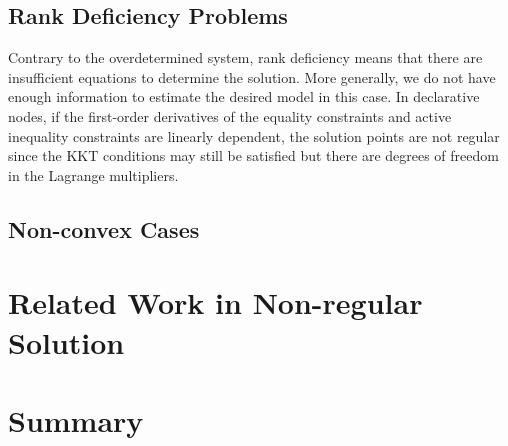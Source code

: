 \subsection{Rank Deficiency Problems}
Contrary to the overdetermined system, rank deficiency means that there are insufficient equations to determine the solution. More generally, we do not have enough information to estimate the desired model in this case. In declarative nodes, if the first-order derivatives of the equality constraints and active inequality constraints are linearly dependent, the solution points are not regular since the KKT conditions may still be satisfied but there are degrees of freedom in the Lagrange multipliers. 



\subsection{Non-convex Cases}



\section{Related Work in Non-regular Solution}
\label{sec:relatedworknonreg}




\section{Summary}



%   






